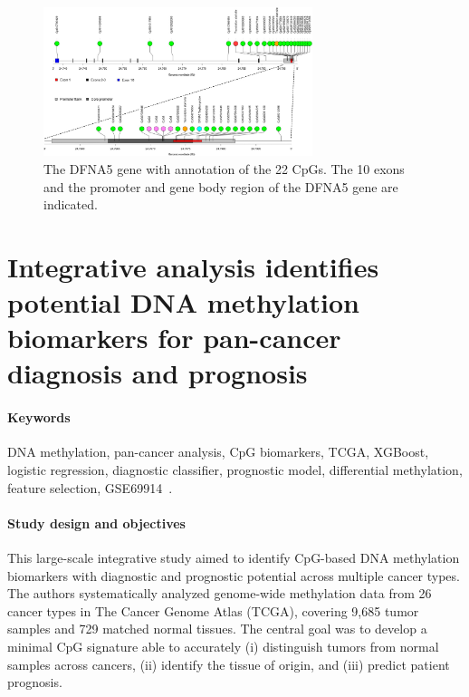 \documentclass[10pt]{extarticle}
\begin{document}
\begin{figure}[H]
    \centering
    \includegraphics[width=0.7\textwidth]{Figures/The DFNA5 gene with annotation of the 22 CpGs..jpg} %
    \caption{The DFNA5 gene with annotation of the 22 CpGs. The 10 exons and the promoter and gene body region of the DFNA5 gene are indicated.}
    \label{fig:22CpG}
\end{figure}


\section{Integrative analysis identifies potential DNA methylation biomarkers for pan-cancer diagnosis and prognosis}

\paragraph{Keywords}
DNA methylation, pan-cancer analysis, CpG biomarkers, TCGA, XGBoost, logistic regression, diagnostic classifier, prognostic model, differential methylation, feature selection, GSE69914~\cite{ding2019pancancer}.

\paragraph{Study design and objectives}
This large-scale integrative study aimed to identify CpG-based DNA methylation biomarkers with diagnostic and prognostic potential across multiple cancer types. The authors systematically analyzed genome-wide methylation data from 26 cancer types in The Cancer Genome Atlas (TCGA), covering 9,685 tumor samples and 729 matched normal tissues. The central goal was to develop a minimal CpG signature able to accurately (i) distinguish tumors from normal samples across cancers, (ii) identify the tissue of origin, and (iii) predict patient prognosis.
\end{document}
